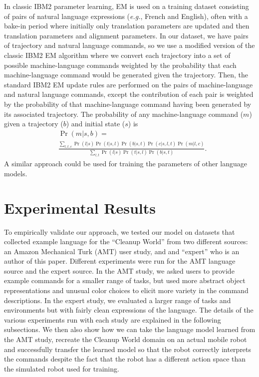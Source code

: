 \documentclass[conference]{IEEEtran}
\begin{document}
In classic IBM2 parameter learning, EM is used on a training dataset consisting of pairs of natural language expressions (\emph{e.g.}, French and English), often with a bake-in period where initially only translation parameters are updated and then translation parameters and alignment parameters. In our dataset, we have pairs of trajectory and natural language commands, so we use a modified version of the classic IBM2 EM algorithm where we convert each trajectory into a set of possible machine-language commands weighted by the probability that each machine-language command would be generated given the trajectory. Then, the standard IBM2 EM update rules are performed on the pairs of machine-language and natural language commands, except the contribution of each pair is weighted by the probability of that machine-language command having been generated by its associated trajectory. The probability of any machine-language command ($m$) given a trajectory ($b$) and initial state ($s$) is
{
\footnotesize
\begin{equation}
\begin{split}
& \Pr(m | s, b) = \\ & \frac{\sum_{l,t,c} \Pr(l | s) \Pr(t | s, l) \Pr(b | s, t) \Pr(c | s, l, t) \Pr(m | l, c)}{\sum_{l,t} \Pr(l | s) \Pr(t | s, l) \Pr(b | s, t)}.
\end{split}
\end{equation}
}
A similar approach could be used for training the parameters of other language models.

\section{Experimental Results}
To empirically validate our approach, we tested our model on datasets that collected example language for the ``Cleanup World'' from two different sources: an Amazon Mechanical Turk (AMT) user study, and and ``expert'' who is an author of this paper. Different experiments were run for the AMT language source and the expert source. In the AMT study, we asked users to provide example commands for a smaller range of tasks, but used more abstract object representations and unusual color choices to elicit more variety in the command descriptions. In the expert study, we evaluated a larger range of tasks and environments but with fairly clean expressions of the language. The details of the various experiments run with each study are explained in the following subsections. We then also show how we can take the language model learned from the AMT study, recreate the Cleanup World domain on an actual mobile robot and successfully transfer the learned model so that the robot correctly interprets the commands despite the fact that the robot has a different action space than the simulated robot used for training.
\end{document}
